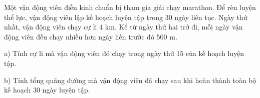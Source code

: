\begin{ex}
Một vận động viên điền kinh chuẩn bị tham gia giải chạy marathon. Để rèn luyện thể lực, vận động viên lập kế hoạch luyện tập trong $30$ ngày liên tục. Ngày thứ nhất, vận động viên chạy cự li $4$ km. Kể từ ngày thứ hai trở đi, mỗi ngày vận động viên đều chạy nhiều hơn ngày liền trước đó $500$ m.

a) Tính cự li mà vận động viên đó chạy trong ngày thứ $15$ của kế hoạch luyện tập.

b) Tính tổng quãng đường mà vận động viên đã chạy sau khi hoàn thành toàn bộ kế hoạch $30$ ngày luyện tập.
\end{ex}
